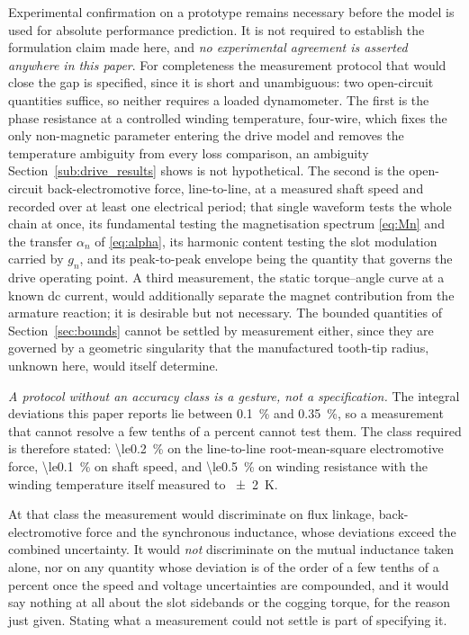 \documentclass[10pt,a4paper,twocolumn]{article}
\theoremstyle{plain}
\theoremstyle{remark}
\begin{document}
Experimental confirmation on a prototype remains necessary before the
model is used for absolute performance prediction. It is not required to
establish the formulation claim made here, and \emph{no experimental
agreement is asserted anywhere in this paper}. For completeness the
measurement protocol that would close the gap is specified, since it is
short and unambiguous: two open-circuit quantities suffice, so neither
requires a loaded dynamometer. The first is the phase resistance at a
controlled winding temperature, four-wire, which fixes the only
non-magnetic parameter entering the drive model and removes the
temperature ambiguity from every loss comparison, an ambiguity
Section~\ref{sub:drive_results} shows is not hypothetical. The second is
the open-circuit back-electromotive force, line-to-line, at a measured
shaft speed and recorded over at least one electrical period; that
single waveform tests the whole chain at once, its fundamental testing
the magnetisation spectrum \eqref{eq:Mn} and the transfer $\alpha_n$ of
\eqref{eq:alpha}, its harmonic content testing the slot modulation
carried by $g_n$, and its peak-to-peak envelope being the quantity that
governs the drive operating point. A third measurement, the static
torque--angle curve at a known dc current, would additionally separate
the magnet contribution from the armature reaction; it is desirable but
not necessary. The bounded quantities of Section~\ref{sec:bounds} cannot
be settled by measurement either, since they are governed by a geometric
singularity that the manufactured tooth-tip radius, unknown here, would
itself determine.

\emph{A protocol without an accuracy class is a gesture, not a
specification.} The integral deviations this paper reports lie between
\SI{0.1}{\percent} and \SI{0.35}{\percent}, so a measurement that cannot
resolve a few tenths of a percent cannot test them. The class required
is therefore stated: \SI{\le0.2}{\percent} on the line-to-line
root-mean-square electromotive force, \SI{\le0.1}{\percent} on shaft
speed, and \SI{\le0.5}{\percent} on winding resistance with the winding
temperature itself measured to \SI{\pm2}{\kelvin}.

At that class the measurement would discriminate on flux linkage,
back-electromotive force and the synchronous inductance, whose
deviations exceed the combined uncertainty. It would \emph{not}
discriminate on the mutual inductance taken alone, nor on any quantity
whose deviation is of the order of a few tenths of a percent once the
speed and voltage uncertainties are compounded, and it would say
nothing at all about the slot sidebands or the cogging torque, for the
reason just given. Stating what a measurement could not settle is part
of specifying it.
\end{document}
